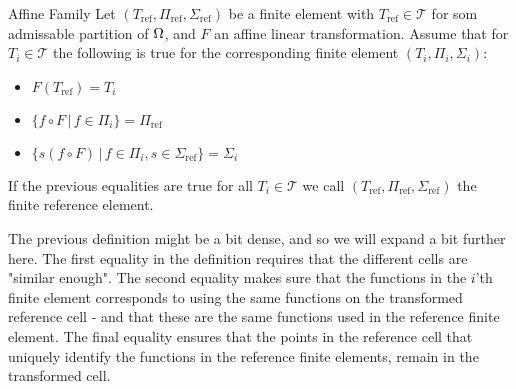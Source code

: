 \iffalse \begin{defn}{Affine Family}
    A family of finite element spaces $S_h$ for partitions $\mathcal{T}_h$ of 
    $\OO\subset \RR^d$ is called an affine family if there exists a finite reference
    element $(T_{\text{ref}}, \Pi_{\text{ref}},\Sigma)$, such that, beside the 
    usual properties of a finite element, there exists some affine mappings 
    $F_j:T_{\text{ref}}\to T_j$ such that
    \begin{equation*}
        \forall v \in S_h \,\,\land \,\, \forall x \in T_j:\,\, v(x) = p(F^{-1}_j(x)) \quad 
        p \in \Pi_{\text{ref}}.
    \end{equation*}
    Meaning, when restricting $v\in S_h$ to some $T_j$, we can fully describe 
    $v$ using some affine mapping and an element in $\Pi_{\text{ref}}$.
\end{defn}
\fi
\begin{defn}{Affine Family} 
    Let $(T_{\text{ref}}, \Pi_{\text{ref}},\Sigma_{\text{ref}})$ be a finite element 
    with $T_{\text{ref}}\in \mathcal{T}$ for som admissable partition of 
    $\Omega$, and 
    $F$ an affine linear transformation. 
    Assume that for $T_i\in\mathcal{T}$ the following 
    is true for the corresponding finite element $(T_i, \Pi_i,\Sigma_i)$:
    \begin{itemize}
        \item $F(T_{\text{ref}}) = T_i$
        \item $\{ f\circ F \,|\,  f \in \Pi_i \} =\Pi_{\text{ref}}  $
        \item $\{ s(f\circ F) \,|\, f \in \Pi_i, s \in \Sigma_{\text{ref}} \} = \Sigma_i$
    \end{itemize}
    If the previous equalities are true for all $T_i\in \mathcal{T}$ we call 
    $(T_{\text{ref}}, \Pi_{\text{ref}},\Sigma_{\text{ref}})$ the finite reference 
    element.
\end{defn}
The previous definition might be a bit dense, and so we will expand a bit 
further here. The first equality in the definition requires that the 
different cells are "similar enough". The second equality makes sure 
that the functions in the $i$'th finite element corresponds 
to using the same  
functions on the transformed reference cell - and that these are the 
same functions used in the reference finite element.
The final equality ensures that the points in the reference cell that 
uniquely identify the functions in the reference finite elements, 
remain in the transformed cell.